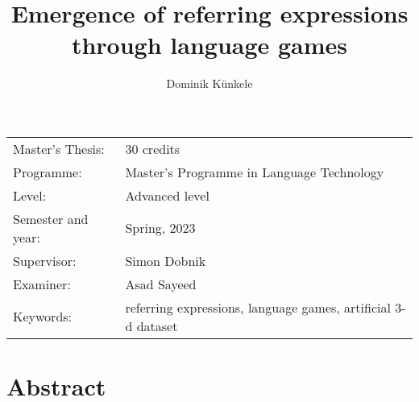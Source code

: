 \documentclass[11pt, a4paper]{article}
\title{Emergence of referring expressions through language games}
\author{Dominik Künkele}
\begin{document}
\begin{titlepage}

    \maketitle

    \vfill

    \begingroup
    \renewcommand*{\arraystretch}{1.2}
    \begin{tabular}{l@{\hskip 20mm}l}
        \hline
        Master's Thesis:   & 30 credits                                                    \\
        Programme:         & Master’s Programme in Language Technology                     \\
        Level:             & Advanced level                                                \\
        Semester and year: & Spring, 2023                                                  \\
        Supervisor:        & Simon Dobnik                                                  \\
        Examiner:          & Asad Sayeed                                                   \\
        Keywords:          & referring expressions, language games, artificial 3-d dataset
    \end{tabular}
    \endgroup

    \thispagestyle{empty}
\end{titlepage}

\newpage
\singlespacing
\section*{Abstract}


\thispagestyle{empty}

\end{document}
